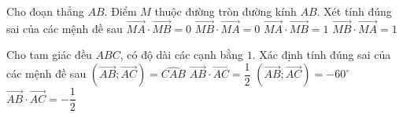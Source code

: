 \begin{ex}%
	Cho đoạn  thẳng $AB$. Điểm $M$ thuộc đường tròn đường kính $AB$.
	Xét  tính đúng sai của các mệnh đề sau
	 \choiceTF
		{\True  $\overrightarrow{MA}\cdot\overrightarrow{MB}=0$}
		 {\True $\overrightarrow{MB}\cdot\overrightarrow{MA}=0$}
		 {$\overrightarrow{MA}\cdot\overrightarrow{MB}=1$}
		 {$\overrightarrow{MB}\cdot\overrightarrow{MA}=1$}
\end{ex}

\begin{ex}%
	Cho tam giác đều $A B  C$, có độ dài các cạnh bằng $1$. Xác định tính đúng sai của các mệnh đề sau
	 \choiceTF
		 {\True $\left(\overrightarrow{A B}; \overrightarrow{A C} \right)=\widehat{CAB}$}
		{\True  $\overrightarrow{A B} \cdot \overrightarrow{A C}=\dfrac{1}{2}$}
		{$\left(\overrightarrow{A B}; \overrightarrow{A C}  \right)=-60^{\circ}$}
		{$\overrightarrow{A B}  \cdot \overrightarrow{A C}=-\dfrac{1}{2}$}
\end{ex}

